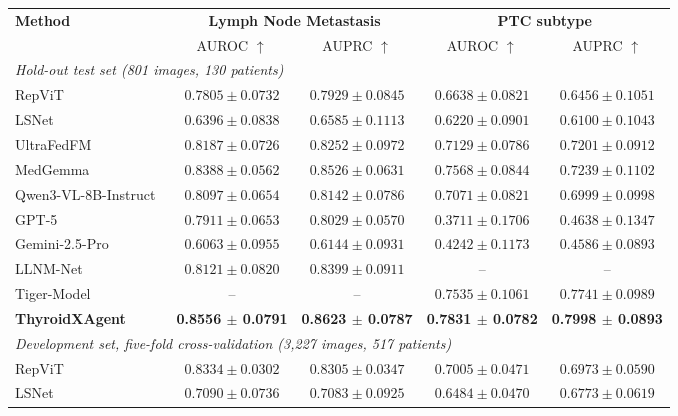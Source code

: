 \documentclass[fleqn,10pt]{wlscirep}
\begin{document}
\begin{appendices}
\begin{table}[p]
\begin{threeparttable}
\begin{tabular}{lcccc}
\toprule
\multirow{2}{*}{\textbf{Method}}
& \multicolumn{2}{c}{\textbf{Lymph Node Metastasis}}
& \multicolumn{2}{c}{\textbf{PTC subtype}} \\
& AUROC $\uparrow$ & AUPRC $\uparrow$ & AUROC $\uparrow$ & AUPRC $\uparrow$ \\
\midrule
\multicolumn{5}{l}{\textit{Hold-out test set (801 images, 130 patients)}} \\
\midrule
RepViT~\cite{wang2023repvit}
& $0.7805 \pm 0.0732$
& $0.7929 \pm 0.0845$
& $0.6638 \pm 0.0821$
& $0.6456 \pm 0.1051$\\
LSNet~\cite{wang2025lsnet}
& $0.6396 \pm 0.0838$
& $0.6585 \pm 0.1113$
& $0.6220 \pm 0.0901$
& $0.6100 \pm 0.1043$\\
UltraFedFM~\cite{jiang2025pretraining}
& $0.8187 \pm 0.0726$
& $0.8252 \pm 0.0972$
& $0.7129 \pm 0.0786$
& $0.7201 \pm 0.0912$\\
MedGemma~\cite{sellergren2025medgemma}
& $0.8388 \pm 0.0562$
& $0.8526 \pm 0.0631$
& $0.7568 \pm 0.0844$
& $0.7239 \pm 0.1102$\\
Qwen3-VL-8B-Instruct~\cite{bai2025qwen3}
& $0.8097 \pm 0.0654$
& $0.8142 \pm 0.0786$
& $0.7071 \pm 0.0821$
& $0.6999 \pm 0.0998$\\
GPT-5~\cite{openai2025gpt5systemcard}
& $0.7911 \pm 0.0653$
& $0.8029 \pm 0.0570$
& $0.3711 \pm 0.1706$
& $0.4638 \pm 0.1347$\\
Gemini-2.5-Pro~\cite{comanici_gemini_2025}
& $0.6063 \pm 0.0955$
& $0.6144 \pm 0.0931$
& $0.4242 \pm 0.1173$
& $0.4586 \pm 0.0893$\\
LLNM-Net~\cite{Shen2025NatCommunLLNM}
& $0.8121 \pm 0.0820$
& $0.8399 \pm 0.0911$
& --
& --\\
Tiger-Model~\cite{Dai2025NatCommunThyroidSubtype}
& --
& --
& $0.7535 \pm 0.1061$
& $0.7741 \pm 0.0989$\\
\rowcolor{lightgray}
\textbf{ThyroidXAgent}
& \textbf{0.8556 $\pm$ 0.0791}
& \textbf{0.8623 $\pm$ 0.0787}
& \textbf{0.7831 $\pm$ 0.0782}
& \textbf{0.7998 $\pm$ 0.0893}\\
\midrule
\multicolumn{5}{l}{\textit{Development set, five-fold cross-validation (3{,}227 images, 517 patients)}} \\
\midrule
RepViT~\cite{wang2023repvit}
& $0.8334 \pm 0.0302$
& $0.8305 \pm 0.0347$
& $0.7005 \pm 0.0471$
& $0.6973 \pm 0.0590$\\
LSNet~\cite{wang2025lsnet}
& $0.7090 \pm 0.0736$
& $0.7083 \pm 0.0925$
& $0.6484 \pm 0.0470$
& $0.6773 \pm 0.0619$\\

\end{tabular}
\end{threeparttable}
\end{table}
\end{appendices}
\end{document}
